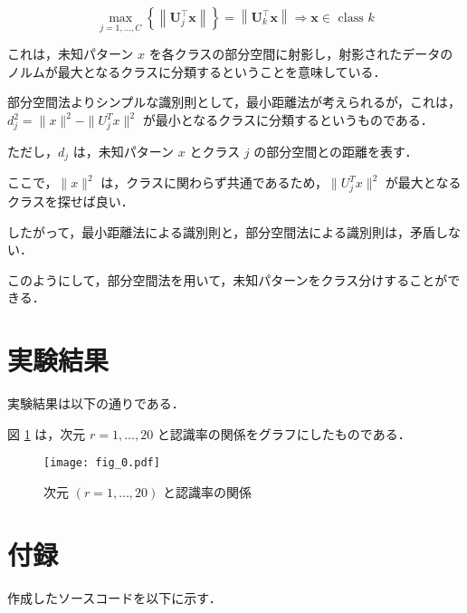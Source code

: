 \documentclass[fleqn, a4paper. 12pt]{jsarticle}
\begin{document}
        \begin{equation}
            \max _{j=1, \ldots, C}\left\{\left\|\mathbf{U}_j^{\top} \boldsymbol{x}\right\|\right\}=\left\|\mathbf{U}_k^{\top} \boldsymbol{x}\right\| \Rightarrow \boldsymbol{x} \in \text { class } k
        \end{equation}

        これは，未知パターン $x$ を各クラスの部分空間に射影し，射影されたデータのノルムが最大となるクラスに分類するということを意味している．

        \quad

        部分空間法よりシンプルな識別則として，最小距離法が考えられるが，これは，$d_j^2 = \|x\|^2 - \|U_j^T x\|^2$ 
        が最小となるクラスに分類するというものである．

        ただし，$d_j$ は，未知パターン $x$ とクラス $j$ の部分空間との距離を表す．

        \quad

        ここで，$\|x\|^2$ は，クラスに関わらず共通であるため，$\|U_j^T x\|^2$ が最大となるクラスを探せば良い．

        したがって，最小距離法による識別則と，部分空間法による識別則は，矛盾しない．

        このようにして，部分空間法を用いて，未知パターンをクラス分けすることができる．

  \section{実験結果}

    実験結果は以下の通りである．

    図 \ref{fig:1} は，次元 $r = 1, \dots, 20$ と認識率の関係をグラフにしたものである．

    \begin{figure}
      \centering
      \texttt{[image: fig\_0.pdf]}
      \caption{次元 $(r = 1, \dots, 20)$ と認識率の関係}
      \label{fig:1}
    \end{figure}

  \section{付録}

    作成したソースコードを以下に示す．
\end{document}
